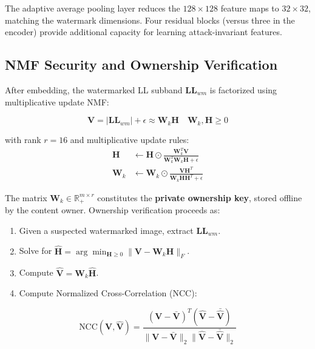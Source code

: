 \documentclass[journal]{IEEEtran}
\begin{document}
The adaptive average pooling layer reduces the $128 \times 128$ feature
maps to $32 \times 32$, matching the watermark dimensions. Four residual
blocks (versus three in the encoder) provide additional capacity for
learning attack-invariant features.

\subsection{NMF Security and Ownership Verification}

After embedding, the watermarked LL subband $\mathbf{LL}_{wm}$ is
factorized using multiplicative update NMF:

\begin{equation}
  \mathbf{V} = |\mathbf{LL}_{wm}| + \epsilon \approx \mathbf{W}_k \mathbf{H}
  \quad \mathbf{W}_k, \mathbf{H} \geq 0
  \label{eq:nmf}
\end{equation}

with rank $r = 16$ and multiplicative update rules:
\begin{align}
  \mathbf{H} &\leftarrow \mathbf{H} \odot \frac{\mathbf{W}_k^T\mathbf{V}}
    {\mathbf{W}_k^T\mathbf{W}_k\mathbf{H} + \epsilon} \label{eq:nmf_H}\\
  \mathbf{W}_k &\leftarrow \mathbf{W}_k \odot \frac{\mathbf{V}\mathbf{H}^T}
    {\mathbf{W}_k\mathbf{H}\mathbf{H}^T + \epsilon} \label{eq:nmf_W}
\end{align}

The matrix $\mathbf{W}_k \in \mathbb{R}^{m \times r}_{+}$ constitutes
the \textbf{private ownership key}, stored offline by the content owner.
Ownership verification proceeds as:

\begin{enumerate}
  \item Given a suspected watermarked image, extract $\mathbf{LL}_{wm}$.
  \item Solve for $\hat{\mathbf{H}} = \arg\min_{\mathbf{H} \geq 0}
    \|\mathbf{V} - \mathbf{W}_k\mathbf{H}\|_F$.
  \item Compute $\hat{\mathbf{V}} = \mathbf{W}_k\hat{\mathbf{H}}$.
  \item Compute Normalized Cross-Correlation (NCC):
\end{enumerate}

\begin{equation}
  \text{NCC}(\mathbf{V}, \hat{\mathbf{V}}) =
  \frac{(\mathbf{V} - \bar{\mathbf{V}})^T(\hat{\mathbf{V}} -
    \bar{\hat{\mathbf{V}}})}
  {\|\mathbf{V} - \bar{\mathbf{V}}\|_2
    \|\hat{\mathbf{V}} - \bar{\hat{\mathbf{V}}}\|_2}
  \label{eq:ncc_verify}
\end{equation}
\end{document}
